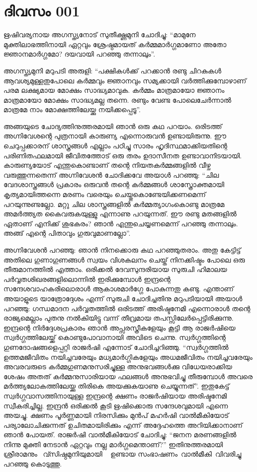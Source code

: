 \newpage
\section{ദിവസം 001}

ഋഷിവര്യനായ അഗസ്ത്യനോട്‌ സുതീക്ഷ്ണമുനി ചോദിച്ചു: ``മാമുനേ
മുക്തിലാഭത്തിനായി ഏറ്റവും ശ്രേഷ്ഠമായത്‌ കര്‍മ്മമാര്‍ഗ്ഗമാണോ അതോ
ജ്ഞാനമാര്‍ഗ്ഗമോ? ദയവായി പറഞ്ഞു തന്നാലും''.

അഗസ്ത്യമുനി മറുപടി അരുളി: ``പക്ഷികള്‍ക്ക്‌ പറക്കാന്‍ രണ്ടു ചിറകുകള്‍
ആവശ്യമുള്ളതുപോലെ കര്‍മ്മവും ജ്ഞാനവും സമ്യക്കായി വര്‍ത്തിക്കുമ്പോഴാണ്‌
പരമ ലക്ഷ്യമായ മോക്ഷം സാദ്ധ്യമാവുക. കര്‍മ്മം മാത്രമായോ ജ്ഞാനം മാത്രമായോ
മോക്ഷം സാദ്ധ്യമല്ല തന്നെ. രണ്ടും വേണ്ട പോലെചേര്‍ന്നാല്‍ മാത്രമേ നാം
മോക്ഷത്തിലേയ്ക്കു നയിക്കപ്പെടൂ''.~

അങ്ങയുടെ ചോദ്യത്തിനുത്തരമായി ഞാന്‍ ഒരു കഥ പറയാം. ഒരിടത്ത്‌ അഗ്നിവേശന്റെ
പുത്രനായി കാരുണ്യ എന്നൊരുവന്‍ ഉണ്ടായിരുന്നു. ഈ ചെറുപ്പക്കാരന്‌
ശാസ്ത്രങ്ങള്‍ എല്ലാം പഠിച്ചു സാരം ഹൃദിസ്ഥമാക്കിയതിന്റെ പരിണിതഫലമായി
ജീവിതത്തോട്‌ ഒരു തരം ഉദാസീനത ഉണ്ടാവാനിടയായി. കാരുണ്യയോട്‌ എന്തുകൊണ്ടാണ്‌
തന്റെ നിയതകര്‍മ്മങ്ങളില്‍ വീഴ്ച വരുത്തുന്നതെന്ന് അഗ്നിവേശന്‍ ചോദിക്കവേ
അയാള്‍ പറഞ്ഞു: ``ചില വേദശാസ്ത്രങ്ങള്‍ പ്രകാരം ഒരുവന്‍ തന്റെ
കര്‍മ്മങ്ങള്‍ ശാസ്ത്രോക്തമായി കൃത്യമായിത്തന്നെ മരണം വരെയും
ചെയ്തുകൊണ്ടേയിക്കണമെന്ന് പറയുന്നുണ്ടല്ലോ. മറ്റു ചില ശാസ്ത്രങ്ങളില്‍
കര്‍മ്മത്യാഗംകൊണ്ടു മാത്രമേ അമര്‍ത്ത്യത കൈവരുകയുള്ളു എന്നാണു പറയുന്നത്‌.
ഈ രണ്ടു മതങ്ങളില്‍ ഏതാണ്‌ എനിക്ക്‌ ശുഭകരം? ഞാന്‍ എന്തുചെയ്യണമെന്ന്
പറഞ്ഞു തന്നാലും. അങ്ങ്‌ എന്റെ പിതാവും ഗുരുവുമാണല്ലോ''.

അഗ്നിവേശന്‍ പറഞ്ഞു: ഞാന്‍ നിനക്കൊരു കഥ പറഞ്ഞുതരാം. അതു കേട്ടിട്ട്‌ അതിലെ
ഗുണാഗുണങ്ങള്‍ സ്വയം വിശകലനം ചെയ്ത്‌ നിനക്കിഷ്ടം പോലെ ഒരു തീരുമാനത്തില്‍
എത്താം. ഒരിക്കല്‍ ദേവസുന്ദരിയായ സുരുചി ഹിമാലയ പര്‍വ്വതശിഖരങ്ങളിലൊന്നില്‍
ഇരിക്കുമ്പോള്‍ ഇന്ദ്രന്റെ സന്ദേശവാഹകരിലൊരാള്‍ ആകാശമാര്‍ഗ്ഗേ പോകുന്നതു
കണ്ടു. എന്താണ്‌ അയാളുടെ യാത്രോദ്ദേശം എന്ന് സുരുചി ചോദിച്ചതിനു മറുപടിയായി
അയാള്‍ പറഞ്ഞു: ഗന്ധമാദന പര്‍വ്വതത്തില്‍ ഒരിടത്ത്‌ അരിഷ്ടനേമി എന്നൊരാള്‍
തന്റെ രാജ്യമെല്ലാം പുതനു നല്‍കിയിട്ടു വന്ന് തീവ്രമായ
തപസ്സിലേര്‍പ്പെട്ടിരിക്കുന്നു. ഇന്ദ്രന്റെ നിര്‍ദ്ദേശപ്രകാരം ഞാന്‍
അപ്സരസ്ത്രീകളേയും കൂട്ടി ആ രാജര്‍ഷിയെ സ്വര്‍ഗ്ഗത്തിലേയ്ക്ക്‌
കൊണ്ടുപോവാനായി അവിടെ ചെന്നു. സ്വര്‍ഗ്ഗത്തിന്റെ ഗുണദോഷങ്ങളെപ്പറ്റി
രാജര്‍ഷി എന്നോട്‌ ചോദിച്ചറിഞ്ഞു. ``സ്വര്‍ഗ്ഗത്തില്‍ ഉത്തമജീവിതം
നയിച്ചവരേയും മധ്യമാര്‍ഗ്ഗികളേയും അധമജീവിതം നയിച്ചവരേയും അവരവരുടെ
കര്‍മ്മഗുണമനുസരിച്ചുള്ള അനുഭവങ്ങള്‍ക്കു വിധേയരാക്കിയ ശേഷം അതത്‌
കര്‍മ്മനുസാരിയായ ഫലങ്ങള്‍ അനുഭവിച്ചു തീരുമ്പോള്‍ അവരെ
മര്‍ത്ത്യലോകത്തിലേയ്ക്കു തിരികെ അയക്കുകയാണു ചെയ്യുന്നത്‌''. ഇതുകേട്ട്‌
സ്വര്‍ഗ്ഗവാസത്തിനായുള്ള ഇന്ദ്രന്റെ ക്ഷണം രാജര്‍ഷിയായ അരിഷ്ടനേമി
സ്വീകരിച്ചില്ല. ഇന്ദ്രന്‍ ഒരിക്കല്‍ കൂടി ഋഷിക്കൊരു സന്ദേശവുമായി എന്നെ
അയച്ചു. ക്ഷണം പൂര്‍ണ്ണമായി നിരസിക്കും മുന്‍പ്‌ മഹര്‍ഷി വാല്‍മീകിയോട്‌
പര്യാലോചിക്കുന്നത്‌ ഉചിതമായിരിക്കും എന്ന് അദ്ദേഹത്തെ അറിയിക്കാനാണ്‌
ഞാന്‍ പോയത്‌. രാജര്‍ഷി വാല്‍മീകിയോട്‌ ചോദിച്ചു: ``ജനന മരണങ്ങളില്‍ നിന്നു
മുക്തി നേടാന്‍ ഏറ്റവും നല്ല മാര്‍ഗ്ഗമെന്താണ്‌?'' ഇതിനുത്തരമായി
ശ്രീരാമനും ~വ്സിഷ്ഠമുനിയുമായി ~ ഉണ്ടായ സംഭാഷണം~വാല്‍മീകി~വിവരിച്ചു
പറഞ്ഞു കൊടുത്തു.

